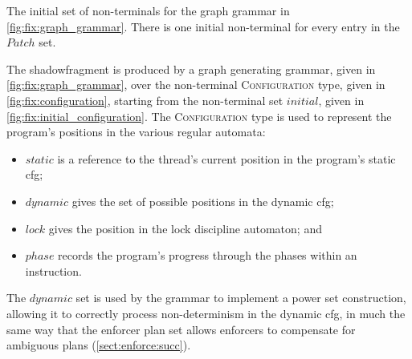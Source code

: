 \begin{sanefig}
  {\hfill}
  {\hfill}
  \caption{The initial set of non-terminals for the graph grammar in
    \autoref{fig:fix:graph_grammar}.  There is one initial
    non-terminal for every entry in the $\mathit{Patch}$ set.}
  \label{fig:fix:initial_configuration}
\end{sanefig}

\noindent
The \gls{shadowfragment} is produced by a graph generating grammar,
given in \autoref{fig:fix:graph_grammar}, over the non-terminal
\textsc{Configuration} type, given in \autoref{fig:fix:configuration},
starting from the non-terminal set $\mathit{initial}$, given in
\autoref{fig:fix:initial_configuration}.  The \textsc{Configuration}
type is used to represent the program's positions in the various
regular automata:
\begin{itemize}
\item $\mathit{static}$ is a reference to the thread's current
  position in the program's \gls{static cfg};
\item $\mathit{dynamic}$ gives the set of possible positions in the
  \gls{dynamic cfg};
\item $\mathit{lock}$ gives the position in the lock discipline
  automaton; and
\item $\mathit{phase}$ records the program's progress through the
  phases within an instruction.
\end{itemize}
The $\mathit{dynamic}$ set is used by the grammar to implement a power
set construction, allowing it to correctly process non-determinism in
the \gls{dynamic cfg}, in much the same way that the enforcer plan set
allows enforcers to compensate for ambiguous plans
(\autoref{sect:enforce:succ}).

